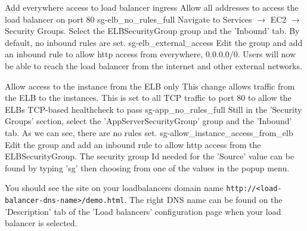 \FloatBarrier

{Add everywhere access to load balancer ingress}
{
Allow all addresses to access the load balancer on port 80
}
{
	\imagefigsinglebox
	{sg-elb_no_rules_full}
 	{ Navigate to Services  $\rightarrow$ EC2  $\rightarrow$ Security Groups. Select the ELBSecurityGroup group and the 'Inbound' tab. By default, no inbound rules are set.}
	\imagefigsinglebox
	{sg-elb_external_access}
	{Edit the group and add an inbound rule to allow http access from everywhere, $0.0.0.0/0$. Users will now be able to reach the load balancer from the internet and other external networks.}
}


\FloatBarrier


{Allow access to the instance from the ELB only}
{This change allows traffic from the ELB to the instances. This is set to all TCP traffic to port 80 to allow the ELBs TCP-based healthcheck to pass}
{
{
	\imagefigsinglebox
	{sg-app_no_rules_full}
	{Still in the 'Security Groups' section, select the 'AppServerSecurityGroup' group and the 'Inbound' tab. As we can see, there are no rules set.}
	\imagefigsinglebox
	{sg-allow_instance_access_from_elb}
	{Edit the group and add an inbound rule to allow http access from the ELBSecurityGroup. The security group Id needed for the 'Source' value can be found by typing 'sg' then choosing from one of the values in the popup menu.}
}
}

\FloatBarrier


You should see the site on your loadbalancers domain name \texttt{http://<load-balancer-dns-name>/demo.html}. The right DNS name can be found on the 'Description' tab of the 'Load balancers' configuration page when your load balancer is selected.




\FloatBarrier